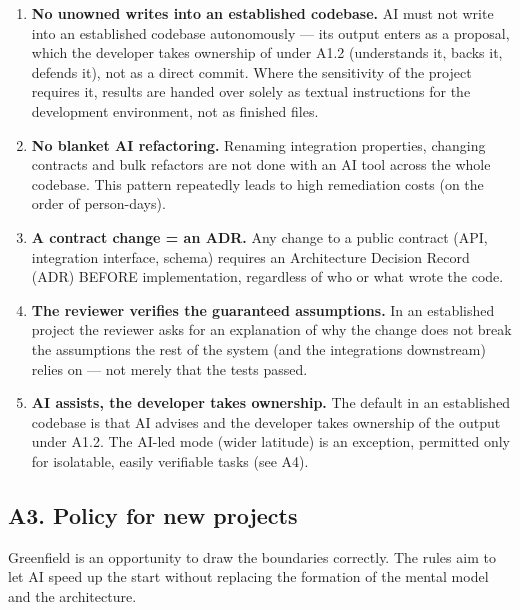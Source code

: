 \begin{enumerate}[label=\textbf{A2.\arabic*}]
\item \textbf{No unowned writes into an established codebase.}
AI must not write into an established codebase autonomously --- its output enters as a proposal, which the developer takes ownership of under A1.2 (understands it, backs it, defends it), not as a direct commit.
Where the sensitivity of the project requires it, results are handed over solely as textual instructions for the development environment, not as finished files.
\item \textbf{No blanket AI refactoring.}
Renaming integration properties, changing contracts and bulk refactors are not done with an AI tool across the whole codebase.
This pattern repeatedly leads to high remediation costs (on the order of person-days).
\item \textbf{A contract change = an ADR.}
Any change to a public contract (API, integration interface, schema) requires an Architecture Decision Record (ADR) BEFORE implementation, regardless of who or what wrote the code.
\item \textbf{The reviewer verifies the guaranteed assumptions.}
In an established project the reviewer asks for an explanation of why the change does not break the assumptions the rest of the system (and the integrations downstream) relies on --- not merely that the tests passed.
\item \textbf{AI assists, the developer takes ownership.}
The default in an established codebase is that AI advises and the developer takes ownership of the output under A1.2.
The AI-led mode (wider latitude) is an exception, permitted only for isolatable, easily verifiable tasks (see A4).
\end{enumerate}

\subsection{A3. Policy for new projects}

Greenfield is an opportunity to draw the boundaries correctly.
The rules aim to let AI speed up the start without replacing the formation of the mental model and the architecture.

